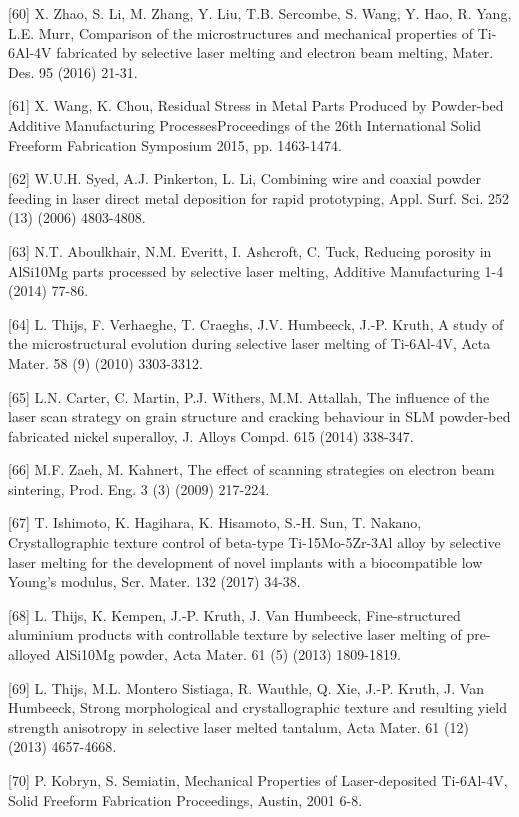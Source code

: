 \documentclass[10pt]{article}
\begin{document}
[60] X. Zhao, S. Li, M. Zhang, Y. Liu, T.B. Sercombe, S. Wang, Y. Hao, R. Yang, L.E. Murr, Comparison of the microstructures and mechanical properties of Ti-6Al-4V fabricated by selective laser melting and electron beam melting, Mater. Des. 95 (2016) 21-31.

[61] X. Wang, K. Chou, Residual Stress in Metal Parts Produced by Powder-bed Additive Manufacturing ProcessesProceedings of the 26th International Solid Freeform Fabrication Symposium 2015, pp. 1463-1474.

[62] W.U.H. Syed, A.J. Pinkerton, L. Li, Combining wire and coaxial powder feeding in laser direct metal deposition for rapid prototyping, Appl. Surf. Sci. 252 (13) (2006) 4803-4808.

[63] N.T. Aboulkhair, N.M. Everitt, I. Ashcroft, C. Tuck, Reducing porosity in AlSi10Mg parts processed by selective laser melting, Additive Manufacturing 1-4 (2014) 77-86.

[64] L. Thijs, F. Verhaeghe, T. Craeghs, J.V. Humbeeck, J.-P. Kruth, A study of the microstructural evolution during selective laser melting of Ti-6Al-4V, Acta Mater. 58 (9) (2010) 3303-3312.

[65] L.N. Carter, C. Martin, P.J. Withers, M.M. Attallah, The influence of the laser scan strategy on grain structure and cracking behaviour in SLM powder-bed fabricated nickel superalloy, J. Alloys Compd. 615 (2014) 338-347.

[66] M.F. Zaeh, M. Kahnert, The effect of scanning strategies on electron beam sintering, Prod. Eng. 3 (3) (2009) 217-224.

[67] T. Ishimoto, K. Hagihara, K. Hisamoto, S.-H. Sun, T. Nakano, Crystallographic texture control of beta-type Ti-15Mo-5Zr-3Al alloy by selective laser melting for the development of novel implants with a biocompatible low Young's modulus, Scr. Mater. 132 (2017) 34-38.

[68] L. Thijs, K. Kempen, J.-P. Kruth, J. Van Humbeeck, Fine-structured aluminium products with controllable texture by selective laser melting of pre-alloyed AlSi10Mg powder, Acta Mater. 61 (5) (2013) 1809-1819.

[69] L. Thijs, M.L. Montero Sistiaga, R. Wauthle, Q. Xie, J.-P. Kruth, J. Van Humbeeck, Strong morphological and crystallographic texture and resulting yield strength anisotropy in selective laser melted tantalum, Acta Mater. 61 (12) (2013) 4657-4668.

[70] P. Kobryn, S. Semiatin, Mechanical Properties of Laser-deposited Ti-6Al-4V, Solid Freeform Fabrication Proceedings, Austin, 2001 6-8.
\end{document}

